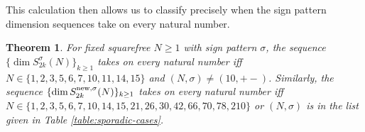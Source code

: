 \documentclass[12pt,letterpaper,reqno]{amsart}
\newtheorem{theorem}{Theorem}[section]
\theoremstyle{definition}
\numberwithin{equation}{section}
\numberwithin{figure}{section}
\numberwithin{table}{section}
\newcommand{\nw}{{\textnormal{new}}}
\begin{document}
This calculation then allows us to classify precisely when the sign pattern dimension sequences take on every natural number.
{
\renewcommand{\thetheorem}{\ref{thm:k-indexed-sgnpatt}}
\begin{theorem} 
    For fixed squarefree $N \ge 1$ with sign pattern $\sigma$, the sequence $\{ \dim S_{2k}^\sigma(N) \}_{k\ge1}$ 
    takes on every natural number iff $N \in \{1,2,3,5,6,7,10,11,14,15\}$ and $(N,\sigma) \ne (10,+-)$. 
    Similarly, the sequence $\{ \dim S_{2k}^{\nw,\sigma}(N) \}_{k\ge1}$ takes on every natural number iff 
$N \in \{
1,\allowbreak 2,\allowbreak 3,\allowbreak 5,\allowbreak 6,\allowbreak 7,\allowbreak 10,\allowbreak 14,\allowbreak 15,\allowbreak 21,\allowbreak 26,\allowbreak 30,\allowbreak 42,\allowbreak 66,\allowbreak 70,\allowbreak 78,\allowbreak 210
\}$ or 
$(N,\sigma)$ is in the list given in Table \ref{table:sporadic-cases}.
\end{theorem}
\addtocounter{theorem}{-1}
}
\end{document}
